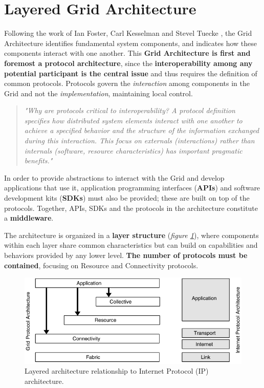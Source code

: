 \section{Layered Grid Architecture}\label{layered_grid_architecture}
Following the work of Ian Foster, Carl Kesselman and Stevel Tuecke \cite{the_anatomy_of_the_grid}, the Grid Architecture identifies fundamental system components, and indicates how these components interact with one another. This \textbf{Grid Architecture is first and foremost a protocol architecture}, since the \textbf{interoperability among any potential participant is the central issue} and thus requires the definition of common protocols. Protocols govern the \textit{interaction} among components in the Grid and not the \textit{implementation}, maintaining local control.

\begin{quotation}
    \textit{"Why are protocols critical to interoperability? A protocol definition specifies how distributed system elements interact with one another to achieve a specified behavior and the structure of the information exchanged during this interaction. This focus on externals (interactions) rather than internals (software, resource characteristics) has important pragmatic benefits." \cite{the_anatomy_of_the_grid}}
\end{quotation}

In order to provide abstractions to interact with the Grid and develop applications that use it, application programming interfaces (\textbf{APIs}) and software development kits (\textbf{SDKs}) must also be provided; these are built on top of the protocols.
Together, APIs, SDKs and the protocols in the architecture constitute a \textbf{middleware}.

The architecture is organized in a \textbf{layer structure} (\textit{figure \ref{fig:grid_protocol_architecture_and_internet_protocol_architecture}}), where components within each layer share common characteristics but can build on capabilities and behaviors provided by any lower level. \textbf{The number of protocols must be contained}, focusing on Resource and Connectivity protocols.

\begin{figure}[!ht]
    \centering
    \includegraphics[scale=1]{document/chapters/chapter_2/images/grid_protocol_architecture_and_internet_protocol_architecture.png}
    \caption{Layered architecture relationship to Internet Protocol (IP) architecture. \cite{the_anatomy_of_the_grid}}
    \label{fig:grid_protocol_architecture_and_internet_protocol_architecture}
\end{figure}

